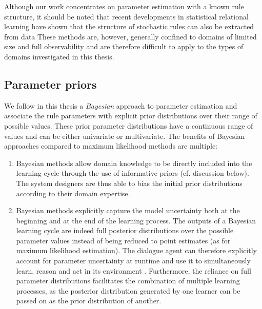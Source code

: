 Although our work concentrates on parameter estimation with a known rule structure, it should be noted that recent developments in statistical relational learning have shown that the structure of stochastic rules can also be extracted from data \citep{PasulaZK07,Kok:2009}  These methods are, however, generally confined to domains of limited size and full observability and are therefore difficult to apply to the types of domains investigated in this thesis.  



\subsection{Parameter priors}
\label{sec:rule-params-priors}

We follow in this thesis a \textit{Bayesian} approach to parameter estimation and associate the rule parameters with explicit prior distributions over their range of possible values.  These prior parameter distributions have a continuous range of values and can be either univariate or multivariate.  The benefits of Bayesian approaches compared to maximum likelihood methods are multiple:
\begin{enumerate} 
\item Bayesian methods allow domain knowledge to be directly included into the learning cycle through the use of informative priors (cf. discussion below). The system designers are thus able to bias the initial prior distributions according to their domain expertise.
\item Bayesian methods explicitly capture the model uncertainty both at the beginning and at the end of the learning process. The outputs of a Bayesian learning cycle are indeed full posterior distributions over the possible parameter values instead of being reduced to point estimates (as for maximum likelihood estimation).  The dialogue agent can therefore explicitly account for parameter uncertainty at runtime and use it to simultaneously learn, reason and act in its environment \citep{Ross:2011}. Furthermore, the reliance on full parameter distributions facilitates the combination of multiple learning processes, as the posterior distribution generated by one learner can be passed on as the prior distribution of another. 
\end{enumerate}

